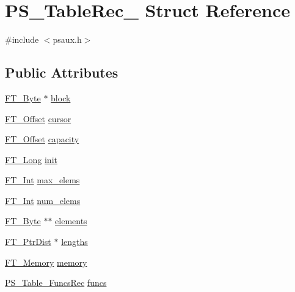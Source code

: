 \hypertarget{struct_p_s___table_rec__}{\section{P\-S\-\_\-\-Table\-Rec\-\_\- Struct Reference}
\label{struct_p_s___table_rec__}
}


{\ttfamily \#include $<$psaux.\-h$>$}

\subsection*{Public Attributes}
\begin{DoxyCompactItemize}
\item 
\hyperlink{fttypes_8h_a51f26183ca0c9f4af958939648caeccd}{F\-T\-\_\-\-Byte} $\ast$ \hyperlink{struct_p_s___table_rec___a6caa7b6aef2ba7e28d260b6a87782723}{block}
\item 
\hyperlink{fttypes_8h_af7b5edd727ac01b0d4729ac848bd4175}{F\-T\-\_\-\-Offset} \hyperlink{struct_p_s___table_rec___a8725d30f75b6dc785b988ed689ac7e58}{cursor}
\item 
\hyperlink{fttypes_8h_af7b5edd727ac01b0d4729ac848bd4175}{F\-T\-\_\-\-Offset} \hyperlink{struct_p_s___table_rec___acf6d4f15ca247960cc7823b73d3c66bf}{capacity}
\item 
\hyperlink{fttypes_8h_a7fa72a1f0e79fb1860c5965789024d6f}{F\-T\-\_\-\-Long} \hyperlink{struct_p_s___table_rec___aa76fb2bcdcf4fc75e880b092bb9d3115}{init}
\item 
\hyperlink{fttypes_8h_af90e5fb0d07e21be9fe6faa33f02484c}{F\-T\-\_\-\-Int} \hyperlink{struct_p_s___table_rec___a8594ec199ad792ed7ffd558806a7d23b}{max\-\_\-elems}
\item 
\hyperlink{fttypes_8h_af90e5fb0d07e21be9fe6faa33f02484c}{F\-T\-\_\-\-Int} \hyperlink{struct_p_s___table_rec___a26706016251497b19039f2c002c4e9d5}{num\-\_\-elems}
\item 
\hyperlink{fttypes_8h_a51f26183ca0c9f4af958939648caeccd}{F\-T\-\_\-\-Byte} $\ast$$\ast$ \hyperlink{struct_p_s___table_rec___a1967f81d98ea65a605968a7e1e5c51c3}{elements}
\item 
\hyperlink{fttypes_8h_a2469cb02129d36e468be22f7a8bf5b33}{F\-T\-\_\-\-Ptr\-Dist} $\ast$ \hyperlink{struct_p_s___table_rec___a955ae6315b89923f1074f3d046da23b1}{lengths}
\item 
\hyperlink{ftsystem_8h_a67ec7ea35cde99a89a65e9f827a9ad3a}{F\-T\-\_\-\-Memory} \hyperlink{struct_p_s___table_rec___a061872add9c6d1af67cfdfac5ce2b80d}{memory}
\item 
\hyperlink{psaux_8h_a55deb0ed740221275bbe1488d786e5f6}{P\-S\-\_\-\-Table\-\_\-\-Funcs\-Rec} \hyperlink{struct_p_s___table_rec___adced5ad36107c90012e9fafa55eab5b9}{funcs}
\end{DoxyCompactItemize}


